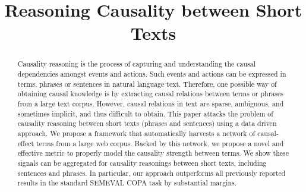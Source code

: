 \documentclass[letterpaper]{article}
\newcommand{\ZY}[1]{\textcolor{red}{J: #1}}
\begin{document}
\title{%
Reasoning Causality between Short Texts 
}


\maketitle
\begin{abstract}
Causality reasoning is the process of capturing and understanding
the causal dependencies amongst events and actions.
Such events and actions can be expressed in terms, phrases or 
sentences in natural language text.
Therefore, one possible way of obtaining causal knowledge is by extracting
causal relations between terms or phrases from a large text corpus. 
However, causal relations in text are sparse, ambiguous, and sometimes implicit,
and thus difficult to obtain.
This paper attacks the problem of causality reasoning between short 
texts (phrases and sentences) using a data driven approach.
We propose a framework that automatically harvests a network of
causal-effect terms from a large web corpus.
Backed by this network, we propose a novel and effective metric to properly 
model the causality strength between terms. We show these signals
can be aggregated for causality reasonings between 
short texts, including sentences and phrases. 
In particular, our approach outperforms all previously 
reported results in the standard SEMEVAL COPA task by substantial margins.

\end{abstract}











\end{document}
